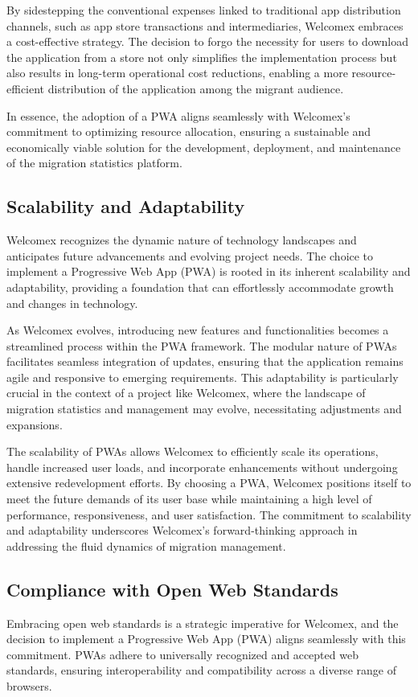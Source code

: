 \documentclass[conference]{IEEEtran}
\begin{document}
By sidestepping the conventional expenses linked to traditional app distribution channels, such as app store transactions and intermediaries, Welcomex embraces a cost-effective strategy. The decision to forgo the necessity for users to download the application from a store not only simplifies the implementation process but also results in long-term operational cost reductions, enabling a more resource-efficient distribution of the application among the migrant audience.

In essence, the adoption of a PWA aligns seamlessly with Welcomex's commitment to optimizing resource allocation, ensuring a sustainable and economically viable solution for the development, deployment, and maintenance of the migration statistics platform.
\subsection{Scalability and Adaptability}
Welcomex recognizes the dynamic nature of technology landscapes and anticipates future advancements and evolving project needs. The choice to implement a Progressive Web App (PWA) is rooted in its inherent scalability and adaptability, providing a foundation that can effortlessly accommodate growth and changes in technology.

As Welcomex evolves, introducing new features and functionalities becomes a streamlined process within the PWA framework. The modular nature of PWAs facilitates seamless integration of updates, ensuring that the application remains agile and responsive to emerging requirements. This adaptability is particularly crucial in the context of a project like Welcomex, where the landscape of migration statistics and management may evolve, necessitating adjustments and expansions.

The scalability of PWAs allows Welcomex to efficiently scale its operations, handle increased user loads, and incorporate enhancements without undergoing extensive redevelopment efforts. By choosing a PWA, Welcomex positions itself to meet the future demands of its user base while maintaining a high level of performance, responsiveness, and user satisfaction. The commitment to scalability and adaptability underscores Welcomex's forward-thinking approach in addressing the fluid dynamics of migration management.
\subsection{Compliance with Open Web Standards}
Embracing open web standards is a strategic imperative for Welcomex, and the decision to implement a Progressive Web App (PWA) aligns seamlessly with this commitment. PWAs adhere to universally recognized and accepted web standards, ensuring interoperability and compatibility across a diverse range of browsers.
\end{document}
